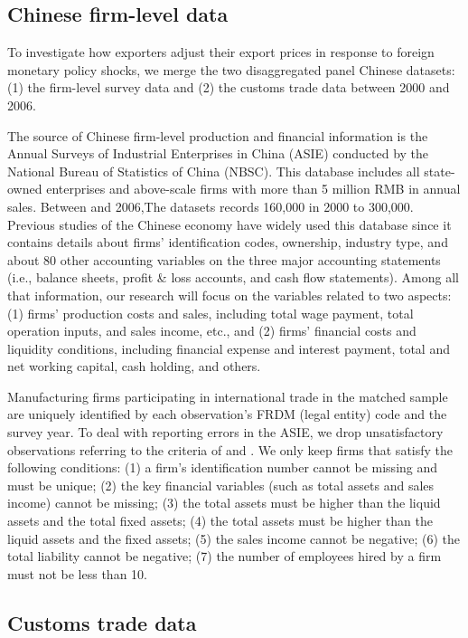\subsection{Chinese firm-level data}

To investigate how exporters adjust their export prices in response to foreign monetary policy shocks, we merge the two disaggregated panel Chinese datasets: (1) the firm-level survey data and (2) the customs trade data between 2000 and 2006.

The source of Chinese firm-level production and financial information is the Annual Surveys of Industrial Enterprises in China (ASIE) conducted by the National Bureau of Statistics of China (NBSC). This database includes all state-owned enterprises and above-scale firms with more than 5 million RMB in annual sales. Between  and 2006,The datasets records 160,000 in 2000 to 300,000. Previous studies of the Chinese economy have widely used this database since it contains details about firms’ identification codes, ownership, industry type, and about 80 other accounting variables on the three major accounting statements (i.e., balance sheets, profit \& loss accounts, and cash flow statements). Among all that information, our research will focus on the variables related to two aspects: (1) firms' production costs and sales, including total wage payment, total operation inputs, and sales income, etc., and (2) firms' financial costs and liquidity conditions, including financial expense and interest payment, total and net working capital, cash holding, and others.

Manufacturing firms participating in international trade in the matched sample are uniquely identified by each observation's FRDM (legal entity) code and the survey year. To deal with reporting errors in the ASIE, we drop unsatisfactory observations referring to the criteria of \cite{fan2015credit} and \cite{brooks2021agglomeration}. We only keep firms that satisfy the following conditions: (1) a firm’s identification number cannot be missing and must be unique; (2) the key financial variables (such as total assets and sales income) cannot be missing;  (3) the total assets must be higher than the liquid assets and the total fixed assets; (4) the total assets must be higher than the liquid assets and the fixed assets; (5) the sales income cannot be negative; (6) the total liability cannot be negative; (7) the number of employees hired by a firm must not be less than 10.

\subsection{Customs trade data}

